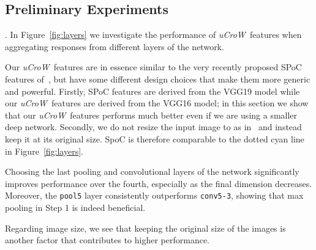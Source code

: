 \documentclass[runningheads]{llncs}
\newcommand{\uCrow}{\textit{uCroW}~}
\newcommand{\Sup}{\textit{\uCrow}}
\newcommand{\SuP}{\textit{\uCrow}}
\begin{document}
\subsection{Preliminary Experiments}
\label{subsec:exp_prelim}

. In Figure~\ref{fig:layers} we investigate the performance of \Sup features when aggregating responses from different layers of the network.

Our \uCrow features are in essence similar to the very recently proposed SPoC features of~\cite{BaLe15}, but have some different design choices that make them more generic and powerful. Firstly, SPoC features are derived from the VGG19 model while our \SuP features are derived from the VGG16 model; in this section we show that our \SuP features performs much better even if we are using a smaller deep network. Secondly, we do not resize the input image to  as in~\cite{BaLe15} and instead keep it at its original size. SpoC is therefore comparable to the dotted cyan line in Figure~\ref{fig:layers}.

Choosing the last pooling and convolutional layers of the network significantly improves performance over the fourth, especially as the final dimension decreases. Moreover, the \texttt{pool5} layer consistently outperforms \texttt{conv5-3}, showing that max pooling in Step 1 is indeed beneficial. 

Regarding image size, we see that keeping the original size of the images is another factor that contributes to higher performance. 
\end{document}
